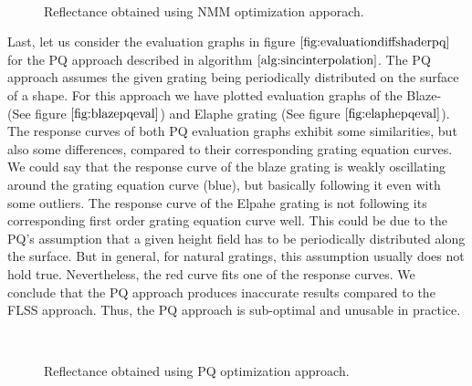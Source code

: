 \begin{figure}[H]
  \centering
~
\caption[Validation of NMM Approach applied on our Gratings]{Reflectance obtained using NMM optimization apporach.}
\label{fig:evaluationdiffshadernminmax}
\end{figure}

Last, let us consider the evaluation graphs in figure $\ref{fig:evaluationdiffshaderpq}$ for the PQ approach described in algorithm $\ref{alg:sincinterpolation}$. The PQ approach assumes the given grating being periodically distributed on the surface of a shape. For this approach we have plotted evaluation graphs of the Blaze- (See figure $\ref{fig:blazepqeval}$) and Elaphe grating (See figure $\ref{fig:elaphepqeval}$). The response curves of both PQ evaluation graphs exhibit some similarities, but also some differences, compared to their corresponding grating equation curves. We could say that the response curve of the blaze grating is weakly oscillating around the grating equation curve (blue), but basically following it even with some outliers. The response curve of the Elpahe grating is not following its corresponding first order grating equation curve well. This could be due to the PQ's assumption that a given height field has to be periodically distributed along the surface. But in general, for natural gratings, this assumption usually does not hold true. Nevertheless, the red curve fits one of the response curves. We conclude that the PQ approach produces inaccurate results compared to the FLSS approach. Thus, the PQ approach is sub-optimal and unusable in practice.

\begin{figure}[H]
  \centering
~
\caption[Validation of PQ Approach applied on our Gratings]{Reflectance obtained using PQ optimization approach.}
\label{fig:evaluationdiffshaderpq}
\end{figure}
